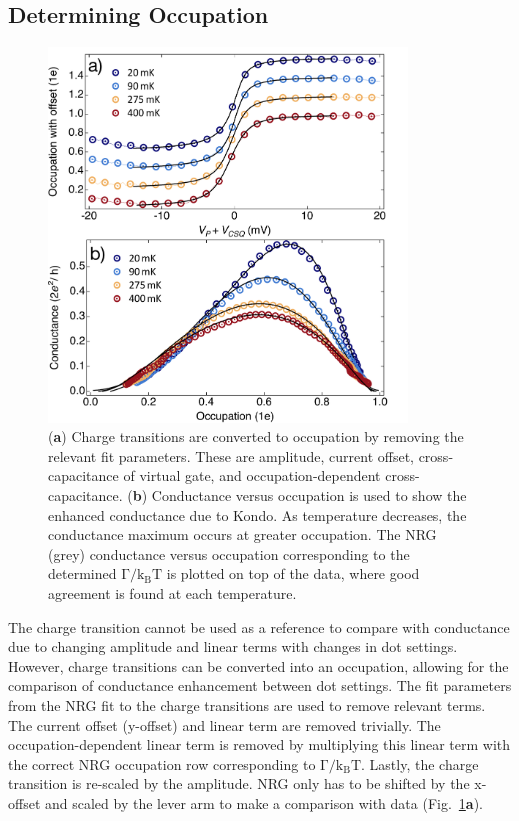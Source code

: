 
\subsection{Determining Occupation}

\begin{figure}[!hbt]
 \begin{center}
 \includegraphics[width=0.85\textwidth]{figures/ch3/figure14.pdf}
 \caption[Conductance versus Occupation : Varying Temperature]{\label{fig:ch3/cond_vs_occ_gf} 
 (\textbf{a}) Charge transitions are converted to occupation by removing the relevant fit parameters. These are amplitude, current offset, cross-capacitance of virtual gate, and occupation-dependent cross-capacitance. (\textbf{b}) Conductance versus occupation is used to show the enhanced conductance due to Kondo. As temperature decreases, the conductance maximum occurs at greater occupation. The NRG (grey) conductance versus occupation corresponding to the determined $\mathrm{\Gamma/k_BT}$ is plotted on top of the data, where good agreement is found at each temperature.}
 \end{center}
\end{figure}


The charge transition cannot be used as a reference to compare with conductance due to changing amplitude and linear terms with changes in dot settings. However, charge transitions can be converted into an occupation, allowing for the comparison of conductance enhancement between dot settings. The fit parameters from the NRG fit to the charge transitions are used to remove relevant terms. The current offset (y-offset) and linear term are removed trivially. The occupation-dependent linear term is removed by multiplying this linear term with the correct NRG occupation row corresponding to $\mathrm{\Gamma/k_BT}$. Lastly, the charge transition is re-scaled by the amplitude. NRG only has to be shifted by the x-offset and scaled by the lever arm to make a comparison with data (Fig.~\ref{fig:ch3/cond_vs_occ_gf}\textbf{a}).


